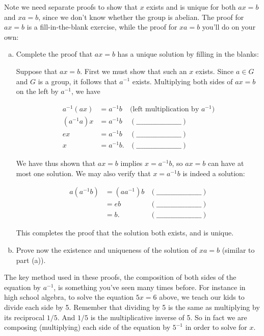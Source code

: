 \noindent
Note we need separate proofs to show that $x$ exists and is unique for both $ax =b$ and $xa = b$, since we don't know whether the group is abelian.  The proof for $ax=b$ is a fill-in-the-blank exercise, while the proof for $xa=b$ you'll do on your own:

\begin{exercise}{48}
\begin{enumerate}[(a)]
\item 
Complete the proof that $ax=b$ has a unique solution by filling in the blanks:

Suppose that $ax = b$. First we must show that such an $x$ exists. Since $a \in G$ and $G$ is a group, it follows that $a^{-1}$ exists.
Multiplying both sides of $ax = b$ on the left by $a^{-1}$, we have 

\begin{align*}
a^{-1}(ax) & = a^{-1}b &\mbox{(left multiplication by $a^{-1}$)}\\
(a^{-1}a)x & = a^{-1}b  &(\_\_\_\_\_\_\_\_\_\_\_\_\_\_\_\_\_\_\_) \\
ex & = a^{-1}b  &(\_\_\_\_\_\_\_\_\_\_\_\_\_\_\_\_\_\_\_) \\
x & = a^{-1}b.  &(\_\_\_\_\_\_\_\_\_\_\_\_\_\_\_\_\_\_\_)  
\end{align*} 
 
We have thus shown that $ax = b$ implies $x  = a^{-1}b$, so $ax = b$ can have at most one solution. We may also verify that $x  = a^{-1}b$ is indeed a solution:

\begin{align*}
a(a^{-1}b) & =  (aa^{-1})b  &(\_\_\_\_\_\_\_\_\_\_\_\_\_\_\_\_\_\_\_) \\
  & = eb  &(\_\_\_\_\_\_\_\_\_\_\_\_\_\_\_\_\_\_\_) \\
 & =b.  &(\_\_\_\_\_\_\_\_\_\_\_\_\_\_\_\_\_\_\_)  
\end{align*} 

This completes the proof that the solution both exists, and is unique.

\item
Prove now the existence and uniqueness of the solution of $xa = b$ (similar to part (a)).
\end{enumerate}
\end{exercise} 
 
The key method used in these proofs, the composition of both sides of the equation by $a^{-1}$, is something you've seen many times before.
For instance in high school algebra, to solve the equation $5x = 6$ above, we teach our kids to divide each side by 5.  Remember that dividing by 5 is the same as multiplying by its reciprocal $1/5$.  And $1/5$ is the multiplicative inverse of 5.  So in fact we are composing (multiplying) each side of the equation by $5^{-1}$ in order to solve for $x$.

